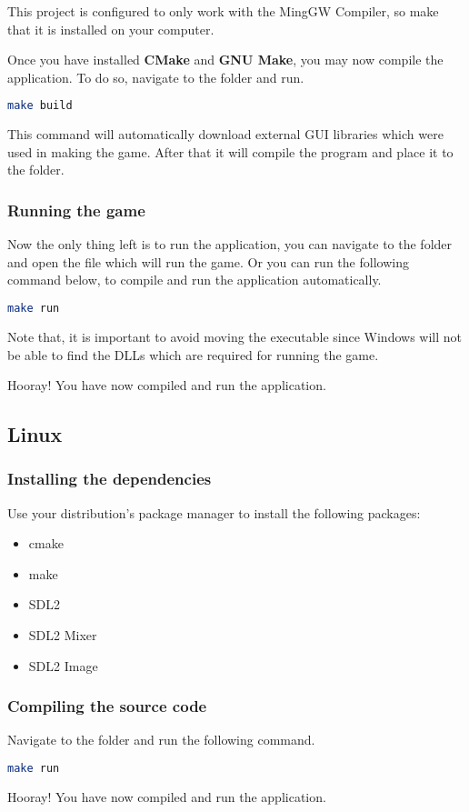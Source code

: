 This project is configured to only work with
the MingGW Compiler, so make that it is installed on your computer.

Once you have installed \textbf{CMake} and \textbf{GNU Make}, you may now
compile the application. To do so, navigate to the 
folder and run.
 
\begin{lstlisting}[language=bash]
make build
\end{lstlisting}

This command will automatically download external GUI libraries which were used
in making the game. After that it will compile the program and place it to the
 folder.

\subsubsection{Running the game}

Now the only thing left is to run the application, you can navigate to the 
folder and open the  file which will run the game. Or you
can run the following command below, to compile and run the application automatically.

\begin{lstlisting}[language=bash]
make run
\end{lstlisting}

Note that, it is important to avoid moving the executable since Windows will not
be able to find the DLLs which are required for running the game.

Hooray! You have now compiled and run the application.

\subsection{Linux}

\subsubsection{Installing the dependencies}

Use your distribution’s package manager to install the following packages:

\begin{itemize}
    \item cmake
    \item make
    \item SDL2
    \item SDL2 Mixer
    \item SDL2 Image
\end{itemize}

\subsubsection{Compiling the source code}
Navigate to the  folder and run the 
following command.

\begin{lstlisting}[language=bash]
make run
\end{lstlisting}

Hooray! You have now compiled and run the application.
